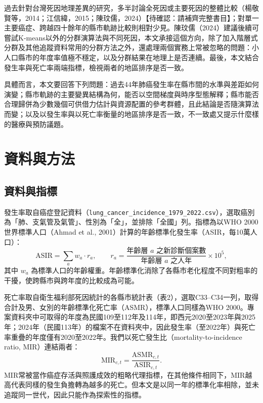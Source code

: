 \documentclass[UTF8,a4paper,11pt]{ctexart}
\newcommand{\note}[1]{\textcolor{red!60!black}{【待確認：#1】}}
\begin{document}
過去針對台灣死因地理差異的研究，多半討論全死因或主要死因的整體比較（楊敬賢等，2014；江信緯，2015；陳玟儒，2024）\note{請補齊完整書目}；對單一主要癌症、跨越四十餘年的縣市軌跡比較則相對少見。陳玟儒（2024）建議後續可嘗試K-means以外的分群演算法與不同死因，本文承接這個方向，除了加入階層式分群及其他追蹤資料常用的分群方法之外，還處理兩個實務上常被忽略的問題：小人口縣市的年度率值極不穩定，以及分群結果在地理上是否連續。最後，本文結合發生率與死亡率兩端指標，檢視兩者的地區排序是否一致。

具體而言，本文要回答下列問題：過去44年肺癌發生率在縣市間的水準與差距如何演變；縣市軌跡的主要變異結構為何，能否以空間梯度與時序型態解釋；縣市能否合理歸併為少數幾個可供借力估計與資源配置的參考群體，且此結論是否隨演算法而變；以及以發生率與以死亡率衡量的地區排序是否一致，不一致處又提示什麼樣的醫療與預防議題。

\section{資料與方法}
\subsection{資料與指標}
發生率取自癌症登記資料（\texttt{lung\_cancer\_incidence\_1979\_2022.csv}），選取癌別為「肺、支氣管及氣管」、性別為「全」，並排除「全國」列。指標為以WHO 2000世界標準人口（Ahmad et al., 2001）計算的年齡標準化發生率（ASIR，每10萬人口）：
\begin{equation}
\mathrm{ASIR}=\sum_{a} w_a\cdot r_a ,\qquad r_a=\frac{\text{年齡層 }a\text{ 之新診斷個案數}}{\text{年齡層 }a\text{ 之人年}}\times 10^5 ,
\end{equation}
其中 $w_a$ 為標準人口的年齡權重。年齡標準化消除了各縣市老化程度不同對粗率的干擾，使跨縣市與跨年度的比較成為可能。

死亡率取自衛生福利部死因統計的各縣市統計表（表2），選取C33--C34一列，取得合計及男、女別的年齡標準化死亡率（ASMR），標準人口同樣為WHO 2000。專案資料夾中可取得的年度為民國109至112年及114年，即西元2020至2023年與2025年；2024年（民國113年）的檔案不在資料夾中，因此發生率（至2022年）與死亡率重疊的年度僅有2020至2022年。我們以死亡發生比（mortality-to-incidence ratio, MIR）連結兩者：
\begin{equation}
\mathrm{MIR}_{c,t}=\frac{\mathrm{ASMR}_{c,t}}{\mathrm{ASIR}_{c,t}} .
\end{equation}
MIR常被當作癌症存活與照護成效的粗略代理指標，在其他條件相同下，MIR越高代表同樣的發生負擔轉為越多的死亡。但本文是以同一年的標準化率相除，並未追蹤同一世代，因此只能作為探索性的指標。
\end{document}
